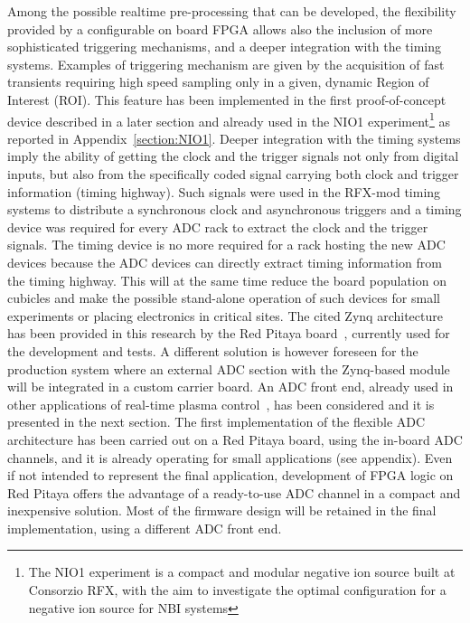 Among the possible realtime pre-processing that can be developed, the flexibility provided by a configurable on board FPGA allows also the inclusion of more sophisticated triggering mechanisms, and a deeper integration with the timing systems. Examples of triggering mechanism are given by the acquisition of fast transients requiring high speed sampling only in a given, dynamic Region of Interest (ROI). This feature has been implemented in the first proof-of-concept device described in a later section and already used in the NIO1 experiment\footnote{The NIO1 experiment is a compact and modular negative ion source built at Consorzio
RFX, with the aim to investigate the optimal configuration for a negative ion source for \acs{NBI} systems} as reported in Appendix~\cref{section:NIO1}. Deeper integration with the timing systems imply the ability of getting the clock and the trigger signals not only from digital inputs, but also from the specifically coded signal carrying both clock and trigger information (timing highway)\cite{dio4}. Such signals were used in the RFX-mod timing systems to distribute a synchronous clock and asynchronous triggers and a timing device was required for every ADC rack to extract the clock and the trigger signals. The timing device is no more required for a rack hosting the new ADC devices because the ADC devices can directly extract timing information from the timing highway. This will at the same time reduce the board population on cubicles and make the possible stand-alone operation of such devices for small experiments or placing electronics in critical sites.
%
The cited Zynq architecture has been provided in this research by the Red Pitaya board~\cite{redpitaya}, currently used for the development and tests. A different solution is however foreseen for the production system where an external ADC section with the Zynq-based module will be integrated in a custom carrier board. 
An ADC front end, already used in other applications of real-time plasma control~\cite{ATCA-MIMO-ISOL}, has been considered and it is presented in the next section. 
The first implementation of the flexible ADC architecture has been carried out on a Red Pitaya board, using the in-board ADC channels, and it is already operating for small applications (see appendix). Even if not intended to represent the final application, development of FPGA logic on Red Pitaya offers the advantage of a ready-to-use ADC channel in a compact and inexpensive solution. Most of the firmware design will be retained in the final implementation, using a different ADC front end. 

